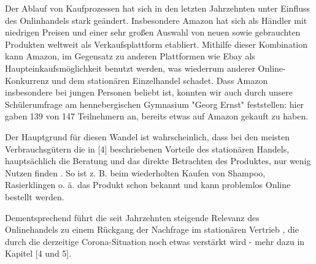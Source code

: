 Der Ablauf von Kaufprozessen hat sich in den letzten Jahrzehnten unter Einfluss des Onlinhandels stark geändert. Insbesondere Amazon hat sich als Händler mit niedrigen Preisen und einer sehr großen Auswahl von neuen sowie gebrauchten Produkten weltweit als Verkaufsplattform etabliert. Mithilfe dieser Kombination kann Amazon, im Gegensatz zu anderen Plattformen wie Ebay als Haupteinkaufsmöglichkeit benutzt werden, was wiederrum anderer Online-Konkurrenz und dem stationären Einzelhandel schadet. Dass Amazon insbesondere bei jungen Personen beliebt ist, konnten wir auch durch unsere Schülerumfrage am hennebergischen Gymnasium "Georg Ernst" feststellen: hier gaben 139 von 147 Teilnehmern an, bereits etwas auf Amazon gekauft zu haben.


Der Hauptgrund für diesen Wandel ist wahrscheinlich, dass bei den meisten Verbrauchsgütern die in [4] beschriebenen Vorteile des stationären Handels, hauptsächlich die Beratung und das direkte Betrachten des Produktes, nur wenig Nutzen finden \cite[S. 2]{Maier}. So ist z. B. beim wiederholten Kaufen von Shampoo, Rasierklingen o. ä. das Produkt schon bekannt und kann problemlos Online bestellt werden. 
\iffalse
    über zeit unkomplizierter geworden
    
    verbilligung des onlinehandels > prime-verlust
    amazon = vorreiter, aliexpress
    
    aliexpress: direkt von hersteller kaufen (https://www.emerald.com/insight/content/doi/10.1108/S1745-886220180000013014/full/pdf?title=italicamazon-and-alibabaitalic-internet-governance-business-models-and-internationalization-strategies 345)
\fi
Dementsprechend führt die seit Jahrzehnten steigende Relevanz des Onlinehandels zu einem Rückgang der Nachfrage im stationären Vertrieb \cite{Shankar}, die durch die derzeitige Corona-Situation noch etwas verstärkt wird - mehr dazu in Kapitel [4 und 5].

\iffalse
 Vorreiter in sachen niedrige Preise > ist sehr wichtig, weil
   viel einfacher vergelichbar, qualität des Produkts nicht einfach einsehbar: sie muss nicht außergewöhnlich, nur akzeptabel sein - jedoch auch nicht schlecht, da 14-tage-rückgabe ohne angabe eines grundes

 
 S 49 https://edoc.sub.uni-hamburg.de/hcu/volltexte/2017/370/pdf/Ebert_Kirsten.pdf
 danach: modell für veränderung
\fi
